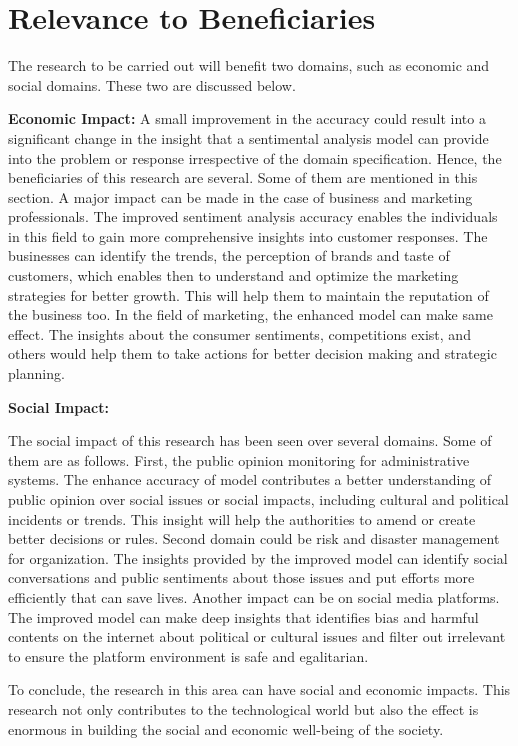 \documentclass[a4paper,onecolumn,11pt]{article}
\begin{document}
\section{Relevance to Beneficiaries}

The research to be carried out will benefit two domains, such as economic and social domains. These two are discussed below.

\textbf{Economic Impact:}
	A small improvement in the accuracy could result into a significant change in the insight that a sentimental analysis model can provide into the problem or response irrespective of the domain specification. Hence, the beneficiaries of this research are several. Some of them are mentioned in this section. A major impact can be made in the case of business and marketing professionals. The improved sentiment analysis accuracy enables the individuals in this field to gain more comprehensive insights into customer responses. The businesses can identify the trends, the perception of brands and taste of customers, which enables then to understand and optimize the marketing strategies for better growth. This will help them to maintain the reputation of the business too. In the field of marketing, the enhanced model can make same effect. The insights about the consumer sentiments, competitions exist, and others would help them to take actions for better decision making and strategic planning. 

\textbf{Social Impact:}

	The social impact of this research has been seen over several domains. Some of them are as follows. First, the public opinion monitoring for administrative systems. The enhance accuracy of model contributes a better understanding of public opinion over social issues or social impacts, including cultural and political incidents or trends. This insight will help the authorities to amend or create better decisions or rules. Second domain could be risk and disaster management for organization. The insights provided by the improved model can identify social conversations and public sentiments about those issues and put efforts more efficiently that can save lives. Another impact can be on social media platforms. The improved model can make deep insights that identifies bias and harmful contents on the internet about political or cultural issues and filter out irrelevant to ensure the platform environment is safe and egalitarian.  

	To conclude,  the research in this area can have social and economic impacts. This research not only contributes to the technological world but also the effect is enormous in building the social and economic well-being of the society.
\end{document}
